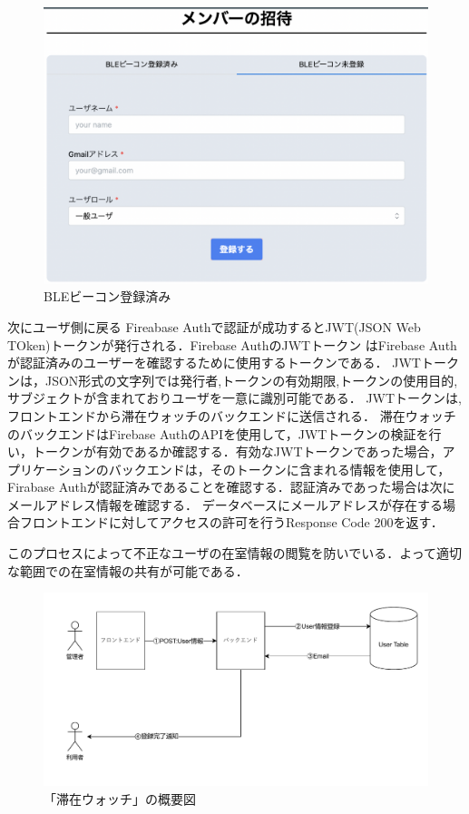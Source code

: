 \begin{figure}[tbh]
  \centering
  \includegraphics[width=16cm]{image/registerNotBLE.png}
  \caption{BLEビーコン登録済み}
  \label{multipleBPM}
\end{figure}



次にユーザ側に戻る
Fireabase Authで認証が成功するとJWT(JSON Web TOken)トークンが発行される．Firebase AuthのJWTトークン はFirebase Authが認証済みのユーザーを確認するために使用するトークンである．
JWTトークンは，JSON形式の文字列では発行者,トークンの有効期限,トークンの使用目的,サブジェクトが含まれておりユーザを一意に識別可能である．
JWTトークンは,フロントエンドから滞在ウォッチのバックエンドに送信される．
滞在ウォッチのバックエンドはFirebase AuthのAPIを使用して，JWTトークンの検証を行い，トークンが有効であるか確認する．有効なJWTトークンであった場合，アプリケーションのバックエンドは，そのトークンに含まれる情報を使用して，Firabase Authが認証済みであることを確認する．認証済みであった場合は次にメールアドレス情報を確認する．
データベースにメールアドレスが存在する場合フロントエンドに対してアクセスの許可を行うResponse Code 200を返す．

このプロセスによって不正なユーザの在室情報の閲覧を防いでいる．よって適切な範囲での在室情報の共有が可能である．



\begin{figure}[h]
  \centering  %
  \includegraphics[clip,scale = 0.7]{image/regsiterUser.pdf}
  \caption{「滞在ウォッチ」の概要図}    \label{StayWatchOverview}
\end{figure}



